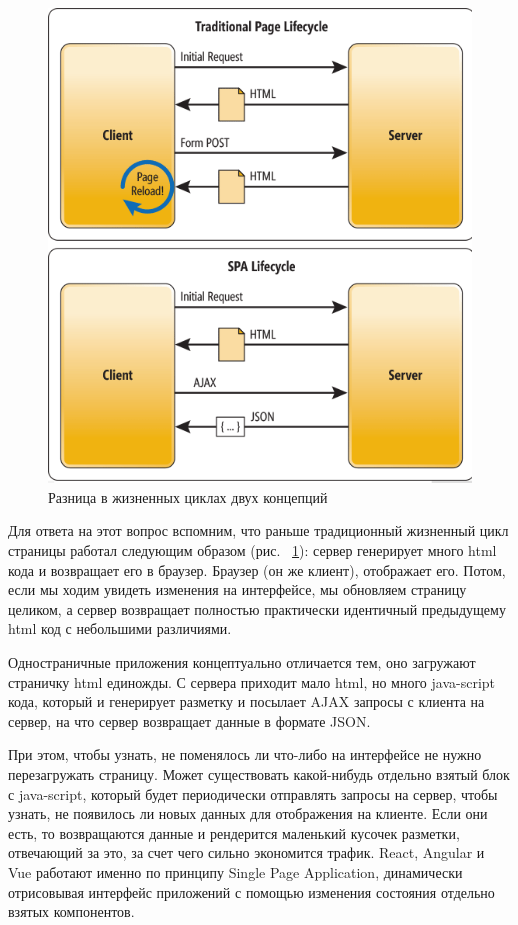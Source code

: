 \documentclass[12pt, a4paper]{diplom}
\begin{document}
\begin{figure}[!ht]
\centering
\includegraphics[width=1\textwidth]{resources/lifecycle.png}
\caption{Разница в жизненных циклах двух концепций}
\label{a}
\end{figure}

Для ответа на этот вопрос вспомним, что раньше традиционный жизненный цикл страницы работал следующим образом (рис. ~\ref{a}): сервер генерирует много html кода и возвращает его в браузер. Браузер (он же клиент), отображает его. Потом, если мы ходим увидеть изменения на интерфейсе, мы обновляем страницу целиком, а сервер возвращает полностью практически идентичный предыдущему html код с небольшими различиями.

Одностраничные приложения концептуально отличается тем, оно загружают страничку html единожды. С сервера приходит мало html, но много java-script кода, который и генерирует разметку и посылает AJAX запросы с клиента на сервер, на что сервер возвращает данные в формате JSON.

При этом, чтобы узнать, не поменялось ли что-либо на интерфейсе не нужно перезагружать страницу. Может существовать какой-нибудь отдельно взятый блок с java-script, который будет периодически отправлять запросы на сервер, чтобы узнать, не появилось ли новых данных для отображения на клиенте. Если они есть, то возвращаются данные и рендерится маленький кусочек разметки, отвечающий за это, за счет чего сильно экономится трафик. React\cite{React}, Angular и Vue работают именно по принципу Single Page Application, динамически отрисовывая интерфейс приложений с помощью изменения состояния отдельно взятых компонентов.
\end{document}

